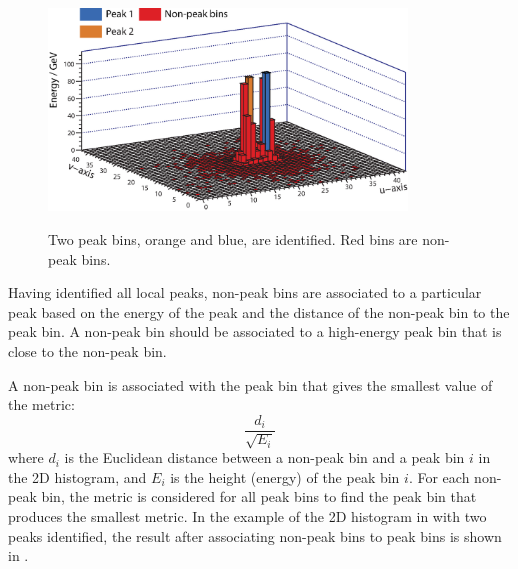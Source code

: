 \begin{figure}[tbph]
\centering
{\includegraphics[width=0.85\textwidth]{photon/peakFindingPeakOnly}}
\caption[Example of projecting a large photon cluster containing two photons.]
{Two peak bins, orange and blue, are identified. Red bins are non-peak bins.}
\label{fig:photonPeakFindingPeakOnly}
\end{figure}



Having identified all local peaks,  non-peak bins  are associated to a particular peak based on the energy of the peak and the distance of the non-peak bin to the peak bin. A non-peak bin should be associated to a high-energy peak bin that is close to the non-peak bin.

A non-peak bin is associated with the peak bin that gives the smallest value of the metric:
\begin{equation}
\frac{d_{i}}{\sqrt{E_{i}}}
\end{equation}
where $d_{i}$ is the Euclidean distance between a non-peak bin and a  peak bin $i$ in the 2D histogram, and $E_{i}$ is the height (energy) of the peak bin $i$. For each non-peak bin, the metric is considered for all peak bins to find the peak bin that produces the smallest metric. In the example of the 2D histogram in  with two peaks identified, the result after associating non-peak bins to peak bins is shown in .

